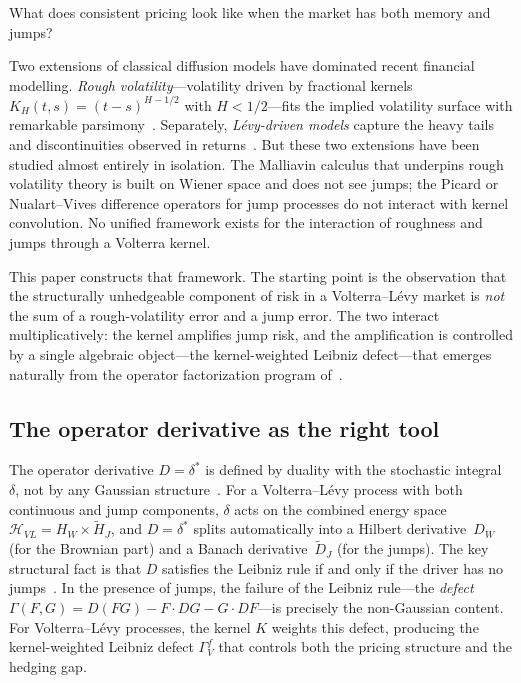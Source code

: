 \documentclass[11pt,a4paper]{article}
\theoremstyle{plain}
\theoremstyle{definition}
\theoremstyle{remark}
\begin{document}
What does consistent pricing look like when the market has both
memory and jumps?

Two extensions of classical diffusion models have dominated recent
financial modelling.  \emph{Rough volatility}---volatility driven
by fractional kernels $K_H(t,s) = (t-s)^{H-1/2}$ with
$H < 1/2$---fits the implied volatility surface with remarkable
parsimony~\cite{ElEuchRosenbaum2019,Fukasawa2021}.  Separately,
\emph{L\'evy-driven models} capture the heavy tails and
discontinuities observed in
returns~\cite{ContTankov2004,Applebaum2009}.  But these two
extensions have been studied almost entirely in isolation.  The
Malliavin calculus that underpins rough volatility theory is built
on Wiener space and does not see jumps; the Picard or
Nualart--Vives difference operators for jump processes do not
interact with kernel convolution.  No unified framework exists
for the interaction of roughness and jumps through a
Volterra kernel.

This paper constructs that framework.  The starting point is
the observation that the structurally unhedgeable component of
risk in a Volterra--L\'evy market is \emph{not} the sum of a
rough-volatility error and a jump error.  The two interact
multiplicatively: the kernel amplifies jump risk, and the
amplification is controlled by a single algebraic object---the
kernel-weighted Leibniz defect---that emerges naturally from
the operator factorization program
of~\cite{Fontes2026a,Fontes2026d}.

\subsection{The operator derivative as the right tool}

The operator derivative $D = \delta^*$ is defined by duality
with the stochastic integral~$\delta$, not by any Gaussian
structure~\cite{Fontes2026a}.  For a Volterra--L\'evy
process with both continuous and jump components, $\delta$
acts on the combined energy space $\mathcal{H}_{VL} = H_W
\times \widetilde{H}_J$, and $D = \delta^*$ splits
automatically into a Hilbert derivative~$D_W$ (for the
Brownian part) and a Banach derivative~$\widetilde{D}_J$
(for the jumps).  The key structural fact is that $D$
satisfies the Leibniz rule if and only if the driver has no
jumps~\cite{Fontes2026d}.  In the presence of jumps, the
failure of the Leibniz rule---the \emph{defect}
$\Gamma(F,G) = D(FG) - F \cdot DG - G \cdot DF$---is
precisely the non-Gaussian content.  For Volterra--L\'evy
processes, the kernel $K$ weights this defect, producing
the kernel-weighted Leibniz defect $\Gamma_V^f$ that
controls both the pricing structure and the hedging gap.
\end{document}
